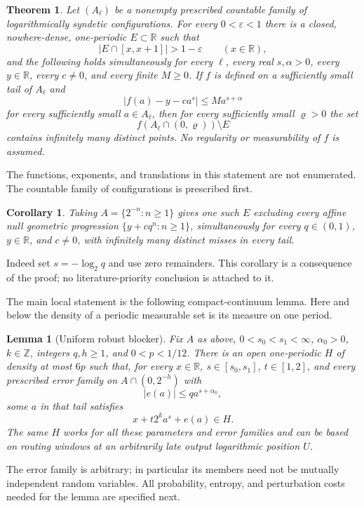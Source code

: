 \documentclass[11pt,letterpaper]{article}
\newtheorem{theorem}{Theorem}
\newtheorem{lemma}{Lemma}
\newtheorem{corollary}{Corollary}
\newcommand{\R}{\mathbb R}
\newcommand{\Z}{\mathbb Z}
\newcommand{\logtwo}{\log_2}
\begin{document}
\begin{theorem}\label{thm:main}
Let $(A_\ell)$ be a nonempty prescribed countable family of logarithmically
syndetic configurations. For every $0<\varepsilon<1$ there is a closed,
nowhere-dense, one-periodic $E\subset\R$ such that
\[
 |E\cap[x,x+1]|>1-\varepsilon\qquad(x\in\R),
\]
and the following holds simultaneously for every $\ell$, every real
$s,\alpha>0$, every $y\in\R$, every $c\ne0$, and every finite $M\ge0$.
If $f$ is defined on a sufficiently small tail of $A_\ell$ and
\[
 |f(a)-y-ca^s|\le M a^{s+\alpha}
\]
for every sufficiently small $a\in A_\ell$, then for every sufficiently small
$\varrho>0$ the set
\[
 f(A_\ell\cap(0,\varrho))\setminus E
\]
contains infinitely many distinct points. No regularity or measurability of
$f$ is assumed.
\end{theorem}
The functions, exponents, and translations in this statement are not
enumerated. The countable family of configurations is prescribed first.

\begin{corollary}\label{cor:geometric}
Taking $A=\{2^{-n}:n\ge1\}$ gives one such $E$ excluding every affine null
geometric progression $\{y+cq^n:n\ge1\}$, simultaneously for every
$q\in(0,1)$, $y\in\R$, and $c\ne0$, with infinitely many distinct misses in
every tail.
\end{corollary}
Indeed set $s=-\logtwo q$ and use zero remainders. This corollary is a consequence
of the proof; no literature-priority conclusion is attached to it.

The main local statement is the following compact-continuum lemma. Here and
below the density of a periodic measurable set is its measure on one period.
\begin{lemma}[Uniform robust blocker]\label{lem:blocker}
Fix $A$ as above, $0<s_0<s_1<\infty$, $\alpha_0>0$, $k\in\Z$, integers
$q,h\ge1$, and $0<p<1/12$. There is an open one-periodic $H$ of density at most
$6p$ such that, for every $x\in\R$, $s\in[s_0,s_1]$, $t\in[1,2]$, and every
prescribed error family on $A\cap(0,2^{-h})$ with
\[
 |e(a)|\le q a^{s+\alpha_0},
\]
some $a$ in that tail satisfies
\[
 x+t2^k a^s+e(a)\in H.
\]
The same $H$ works for all these parameters and error families and can be based
on routing windows at an arbitrarily late output logarithmic position $U$.
\end{lemma}
The error family is arbitrary; in particular its members need not be mutually
independent random variables. All probability, entropy, and perturbation costs
needed for the lemma are specified next.
\end{document}
